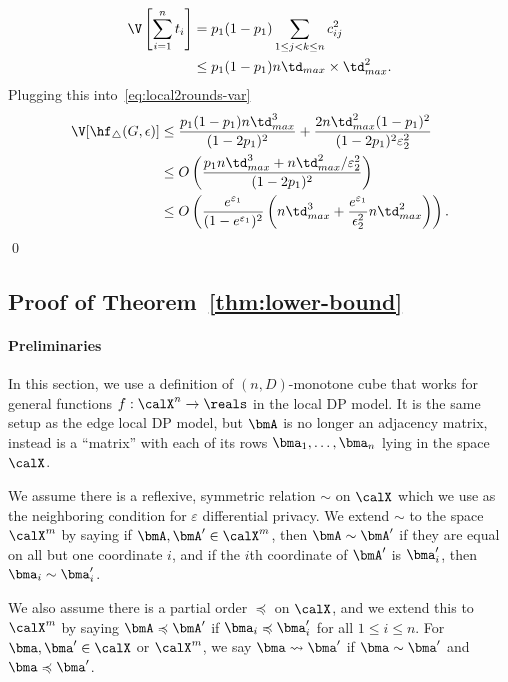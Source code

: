   \begin{align*}
    \V\left[\sum_{i=1}^n t_i \right] &=
    p_1(1-p_1) \sum_{1 \leq j < k \leq n} c_{ij}^2 \\ 
    &\leq p_1(1-p_1) n\td_{max} \times \td_{max}^2.
  \end{align*}
  Plugging this into~\eqref{eq:local2rounds-var}
  \begin{align*}
    \V[\hf_\triangle(G,\epsilon)] &\leq \frac{p_1(1-p_1)n\td_{max}^3}{(1-2p_1)^2} +
    \frac{2n\td_{max}^2(1-p_1)^2}{(1-2p_1)^2\varepsilon_2^2} \\
    &\leq O\left(\frac{p_1 n\td_{max}^3 + n\td_{max}^2/\varepsilon_2^2}{(1-2p_1)^2} \right) \\
    &\leq O\left(\frac{e^{\varepsilon_1}}{(1-e^{\varepsilon_1})^2} \left(n\td_{max}^3 +
    \frac{e^{\varepsilon_1}}{\epsilon_2^2}n\td_{max}^2\right)\right).
  \end{align*}
  \qed

\subsection{Proof of Theorem~\ref{thm:lower-bound}}

\label{sub:proof_thm_lower-bound}

\paragraph{Preliminaries}
In this section, we use a definition of $(n,D)$-monotone cube that works for
general functions $f : \calX^{n} \rightarrow \reals$ in the
local DP model. It is the same setup as the edge local DP model, but $\bmA$ is
no longer an adjacency
matrix, instead is a ``matrix'' with each of its rows $\bma_1,\ldots,\bma_n$
lying in the space $\calX$. 

We assume there is a reflexive,
symmetric relation $\sim$ on $\calX$ which we use as the neighboring condition for
$\varepsilon$ differential privacy.
We extend $\sim$ to the space $\calX^m$ by saying
if $\bmA,\bmA' \in
\calX^m$, then $\bmA \sim \bmA'$ if they are equal on all but one coordinate
$i$, and if the $i$th coordinate of $\bmA'$ is $\bma_i'$, then $\bma_i \sim
\bma_i'$.

We also assume there is a partial order $\preccurlyeq$ on $\calX$, and we extend
this to $\calX^m$ by saying $\bmA \preccurlyeq \bmA'$ if $\bma_i \preccurlyeq
\bma_i'$ for all $1 \leq i \leq n$.
For $\bma, \bma' \in \calX$ or $\calX^m$, we say $\bma \leadsto \bma'$ if $\bma
\sim \bma'$ and $\bma \preccurlyeq \bma'$.

